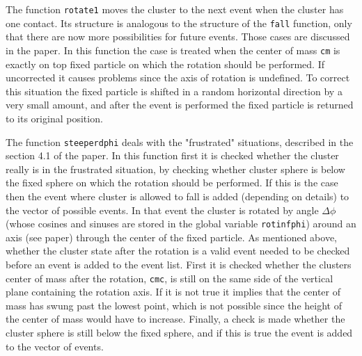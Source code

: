 \documentclass[12pt]{article}
\begin{document}
The function \texttt{rotate1} moves the cluster to the next event when the cluster has one contact. Its  structure is analogous to the structure of the \texttt{fall} function, only that there are now more possibilities for future events. Those cases are discussed in the paper. In this function the case is treated when the center of mass \texttt{cm} is exactly on top fixed particle on which the rotation should be performed. If uncorrected it causes problems since the axis of rotation is undefined. To correct this situation the fixed particle is shifted in a random horizontal direction by a very small amount, and after the event is performed the fixed particle is returned to its original position. 

The function \texttt{steeperdphi} deals with the "frustrated" situations, described in the section 4.1 of the paper. In this function first it is checked whether the cluster really is in the frustrated situation, by checking whether cluster sphere is below the fixed sphere on which the rotation should be performed. If this is the case then the event where cluster is allowed to fall is added (depending on details) to the vector of possible events. In that event the cluster is rotated by angle $\Delta\phi$ (whose cosines and sinuses are stored in the global variable \texttt{rotinfphi}) around an axis (see paper) through the center of the fixed particle. As mentioned above, whether the cluster state after the rotation is a valid event needed to be checked before an event is added to the event list. First it is checked whether the clusters center of mass after the rotation, \texttt{cmc}, is still on the same side of the vertical plane containing the rotation axis. If it is not true it implies that the center of mass has swung past the lowest point, which is not possible since the height of the center of mass would have to increase. Finally, a check is made whether the cluster sphere is still below the fixed sphere, and if this is true the event is added to the vector of events. 
\end{document}
